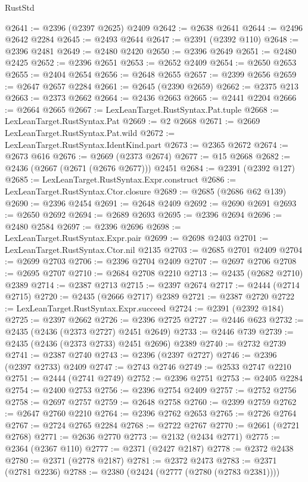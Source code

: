 \begin{lexlean}{RustStd}
\begin{coremodule}
@2641 := @2396 (@2397 @2625) @2409
@2642 := @2638 @2641
@2644 := @2496 @2642 @2284
@2645 := @2493 @2644
@2647 := @2391 (@2392 @110)
@2648 := @2396 @2481
@2649 := @2480 @2420
@2650 := @2396 @2649
@2651 := @2480 @2425
@2652 := @2396 @2651
@2653 := @2652 @2409
@2654 := @2650 @2653
@2655 := @2404 @2654
@2656 := @2648 @2655
@2657 := @2399 @2656
@2659 := @2647 @2657 @2284
@2661 := @2645 (@2390 @2659)
@2662 := @2375 @213
@2663 := @2373 @2662
@2664 := @2436 @2663
@2665 := @2441 @2204
@2666 := @2664 @2665
@2667 := LexLeanTarget.RustSyntax.Pat.tuple
@2668 := LexLeanTarget.RustSyntax.Pat
@2669 := @2 @2668
@2671 := @2669 LexLeanTarget.RustSyntax.Pat.wild
@2672 := LexLeanTarget.RustSyntax.IdentKind.part
@2673 := @2365 @2672
@2674 := @2673 @616
@2676 := @2669 (@2373 @2674)
@2677 := @15 @2668
@2682 := @2436 (@2667 (@2671 (@2676 @2677))) @2451
@2684 := @2391 (@2392 @127)
@2685 := LexLeanTarget.RustSyntax.Expr.construct
@2686 := LexLeanTarget.RustSyntax.Ctor.closure
@2689 := @2685 (@2686 @62 @139)
@2690 := @2396 @2454
@2691 := @2648 @2409
@2692 := @2690 @2691
@2693 := @2650 @2692
@2694 := @2689 @2693
@2695 := @2396 @2694
@2696 := @2480 @2584
@2697 := @2396 @2696
@2698 := LexLeanTarget.RustSyntax.Expr.pair
@2699 := @2698 @2403
@2701 := LexLeanTarget.RustSyntax.Ctor.nil @2135
@2703 := @2685 @2701 @2409
@2704 := @2699 @2703
@2706 := @2396 @2704 @2409
@2707 := @2697 @2706
@2708 := @2695 @2707
@2710 := @2684 @2708 @2210
@2713 := @2435 (@2682 @2710) @2389
@2714 := @2387 @2713
@2715 := @2397 @2674
@2717 := @2444 (@2714 @2715)
@2720 := @2435 (@2666 @2717) @2389
@2721 := @2387 @2720
@2722 := LexLeanTarget.RustSyntax.Expr.succeed
@2724 := @2391 (@2392 @184)
@2725 := @2397 @2662
@2726 := @2396 @2725
@2727 := @2446 @623
@2732 := @2435 (@2436 (@2373 @2727) @2451 @2649)
@2733 := @2446 @739
@2739 := @2435 (@2436 (@2373 @2733) @2451 @2696) @2389
@2740 := @2732 @2739
@2741 := @2387 @2740
@2743 := @2396 (@2397 @2727)
@2746 := @2396 (@2397 @2733) @2409
@2747 := @2743 @2746
@2749 := @2533 @2747 @2210
@2751 := @2444 (@2741 @2749)
@2752 := @2396 @2751
@2753 := @2405 @2284
@2754 := @2400 @2753
@2756 := @2396 @2754 @2409
@2757 := @2752 @2756
@2758 := @2697 @2757
@2759 := @2648 @2758
@2760 := @2399 @2759
@2762 := @2647 @2760 @2210
@2764 := @2396 @2762 @2653
@2765 := @2726 @2764
@2767 := @2724 @2765 @2284
@2768 := @2722 @2767
@2770 := @2661 (@2721 @2768)
@2771 := @2636 @2770
@2773 := @2132 (@2434 @2771)
@2775 := @2364 (@2367 @110)
@2777 := @2371 (@2427 @2187)
@2778 := @2372 @2438
@2780 := @2371 (@2778 @2187)
@2781 := @2372 @2473
@2783 := @2371 (@2781 @2236)
@2788 := @2380 (@2424 (@2777 (@2780 (@2783 @2381))))

\end{coremodule}
\end{lexlean}
